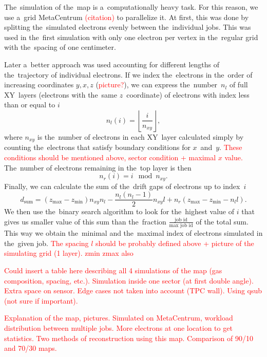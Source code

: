 		The~simulation of the~map is a~computationally heavy task. For this reason, we use a~grid MetaCentrum \textcolor{red}{(citation)} to parallelize it. At first, this was done by splitting the~simulated electrons evenly between the~individual jobs. This was used in the~first simulation with only one electron per vertex in the~regular grid with the~spacing of one centimeter. 
		
		Later a~better approach was used accounting for different lengths of the~trajectory of individual electrons. If we index the~electrons in the~order of increasing coordinates $y,x,z$ (\textcolor{red}{picture?}), we can express the~number~$n_l$ of full XY~layers (electrons with the~same $z$~coordinate) of electrons with index less than or equal to $i$
			\begin{equation}
				n_l(i) = \left\lfloor\frac{i}{n_{xy}}\right\rfloor,
			\end{equation}
		where $n_{xy}$ is the~number of electrons in each XY~layer calculated simply by counting the~electrons that satisfy boundary conditions for $x$~and~$y$. \textcolor{red}{These conditions should be mentioned above, sector condition + maximal $x$ value.} The~number of electrons remaining in the~top layer is then
			\begin{equation}
				n_r(i) = i\!\!\!\!\mod n_{xy}.
			\end{equation}
		Finally, we can calculate the sum of the~drift gaps of electrons up to index~$i$
			\begin{equation}
				d_\text{sum} = (z_\text{max}-z_\text{min})n_{xy}n_l-\frac{n_l(n_l-1)}{2}n_{xy}l+n_r(z_\text{max}-z_\text{min}-n_l l).
			\end{equation}
		We then use the~binary search algorithm to look for the~highest value of $i$ that gives us smaller value of this sum than the~fraction $\frac{\text{job id}}{\text{max job id}}$ of the total sum. This way we obtain the~minimal and the~maximal index of electrons simulated in the~given job.
		\textcolor{red}{The spacing $l$ should be probably defined above + picture of the simulating grid (1 layer). zmin zmax also}
		
		\textcolor{red}{Could insert a table here describing all 4 simulations of the map (gas composition, spacing, etc.). Simulation inside one sector (at first double angle). Extra space on sensor. Edge cases not taken into account (TPC wall). Using qsub (not sure if important).}
		
		\textcolor{red}{Explanation of the map, pictures. Simulated on MetaCentrum, workload distribution between multiple jobs. More electrons at one location to get statistics. Two methods of reconstruction using this map. Comparison of 90/10 and 70/30 maps.}
		
